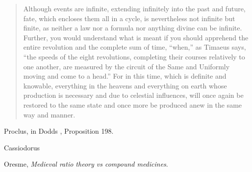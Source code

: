 \documentclass{amsart}
\theoremstyle{definition}
\begin{document}
\begin{quote}
Although events are infinite, extending infinitely into the past and future, fate, which encloses them all in a cycle, is nevertheless not infinite but finite, as neither a law nor a formula
nor anything divine can be infinite. Further, you would understand what is meant if you should apprehend the entire revolution and the complete sum of time, ``when,''
as Timaeus says, ``the speeds of the eight revolutions, completing their courses relatively to one another, are measured by the circuit of the Same and Uniformly moving and come to a head.''
For
in this time, which is definite and knowable, everything in the heavens
and everything on earth whose production is necessary and due to 
celestial influences, will once again be restored to the same state
and once more be produced anew in the same way and manner.
\end{quote}


Proclus, in Dodds \cite[pp.~173, 302]{dodds}, Proposition 198.

Cassiodorus \cite{cassiodorus}

Oresme, {\em Medieval ratio theory vs compound medicines}.

\nocite{*}



\end{document}
